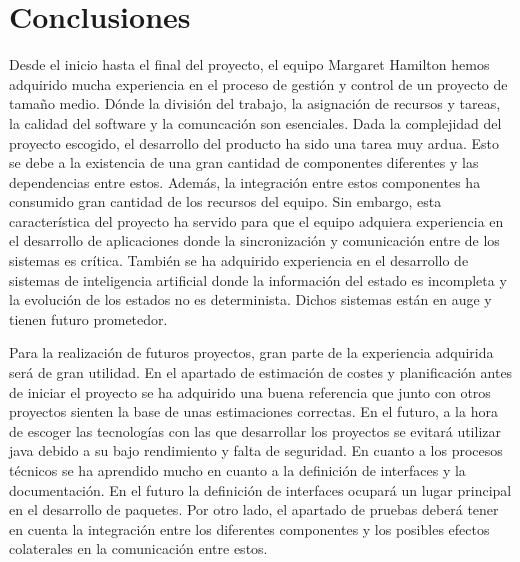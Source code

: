 \section{Conclusiones}
\label{conclusiones}

Desde el inicio hasta el final del proyecto, el equipo Margaret Hamilton hemos adquirido mucha experiencia en el proceso de gestión y control de un proyecto de tamaño medio. Dónde la división del trabajo, la asignación de recursos y tareas, la calidad del software y la comuncación son esenciales. Dada la complejidad del proyecto escogido, el desarrollo del producto ha sido una tarea muy ardua. Esto se debe a la existencia de una gran cantidad de componentes diferentes y las dependencias entre estos. Además, la integración entre estos componentes ha consumido gran cantidad de los recursos del equipo. Sin embargo, esta característica del proyecto ha servido para que el equipo adquiera experiencia en el desarrollo de aplicaciones donde la sincronización y comunicación entre de los sistemas es crítica. También se ha adquirido experiencia en el desarrollo de sistemas de inteligencia artificial donde la información del estado es incompleta y la evolución de los estados no es determinista. Dichos sistemas están en auge y tienen futuro prometedor.

Para la realización de futuros proyectos, gran parte de la experiencia adquirida será de gran utilidad. En el apartado de estimación de costes y planificación antes de iniciar el proyecto se ha adquirido una buena referencia que junto con otros proyectos sienten la base de unas estimaciones correctas. En el futuro, a la hora de escoger las tecnologías con las que desarrollar los proyectos se evitará utilizar java debido a su bajo rendimiento y falta de seguridad. En cuanto a los procesos técnicos se ha aprendido mucho en cuanto a la definición de interfaces y la documentación. En el futuro la definición de interfaces ocupará un lugar principal en el desarrollo de paquetes. Por otro lado, el apartado de pruebas deberá tener en cuenta la integración entre los diferentes componentes y los posibles efectos colaterales en la comunicación entre estos.
